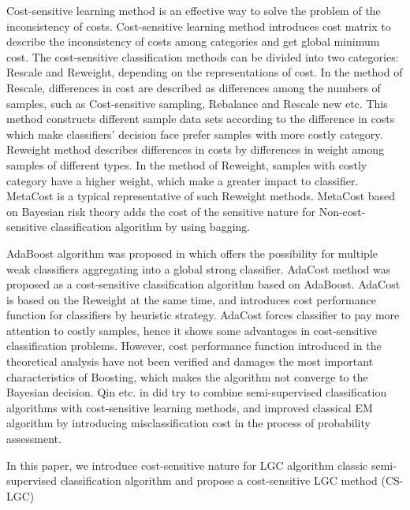 \documentclass{svjour3}                     %
\begin{document}
Cost-sensitive learning method is an effective way to solve the problem of the inconsistency of costs. Cost-sensitive learning method introduces cost matrix to describe the inconsistency of costs among categories and get global minimum cost. The cost-sensitive classification methods can be divided into two categories: Rescale and Reweight, depending on the representations of cost. In the method of Rescale, differences in cost are described as differences among the numbers of samples, such as Cost-sensitive sampling\cite{gao2011active}, Rebalance\cite{elkan2001foundations} and Rescale new\cite{zhou2010multi} etc. This method constructs different sample data sets according to the difference in costs which make classifiers' decision face prefer samples with more costly category. Reweight method describes differences in costs by differences in weight among samples of different types. In the method of Reweight, samples with costly category have a higher weight, which make a greater impact to classifier. MetaCost\cite{domingos1999metacost} is a typical representative of such Reweight methods. MetaCost based on Bayesian risk theory adds the cost of the sensitive nature for Non-cost-sensitive classification algorithm by using bagging\cite{khoshgoftaar2011comparing}.

AdaBoost algorithm was proposed in\cite{jin2010multi} which offers the possibility for multiple weak classifiers aggregating into a global strong classifier. AdaCost method\cite{fan1999adacost} was proposed as a cost-sensitive classification algorithm based on AdaBoost. AdaCost is based on the Reweight at the same time, and introduces cost performance function for classifiers by heuristic strategy. AdaCost forces classifier to pay more attention to costly samples, hence it shows some advantages in cost-sensitive classification problems. However, cost performance function introduced in the theoretical analysis have not been verified and damages the most important characteristics of Boosting,  which makes the algorithm not converge to the Bayesian decision. Qin etc. in \cite{qin2008cost} did try to combine semi-supervised classification algorithms with cost-sensitive learning methods, and improved classical EM algorithm by introducing misclassification cost in the process of probability assessment.

In this paper, we introduce cost-sensitive nature for LGC algorithm classic semi-supervised classification algorithm and propose a cost-sensitive LGC method (CS-LGC)
\end{document}
